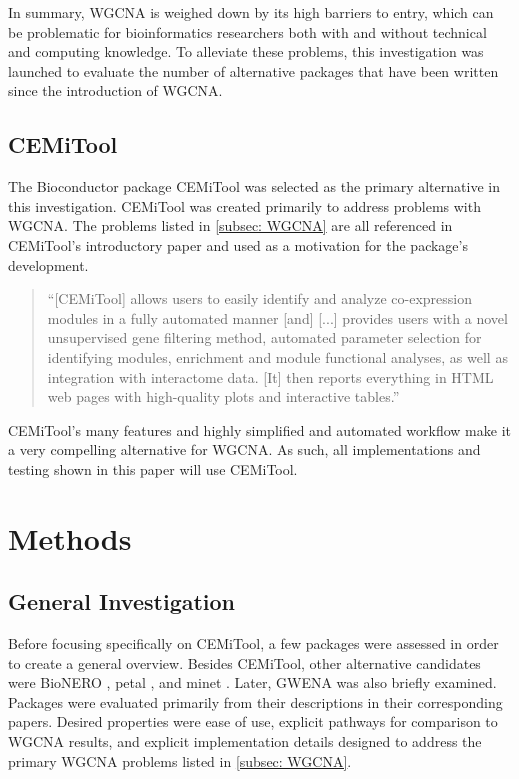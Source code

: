 In summary, WGCNA is weighed down by its high barriers to entry, which can be problematic for bioinformatics researchers both with and without technical and computing knowledge. To alleviate these problems, this investigation was launched to evaluate the number of alternative packages that have been written since the introduction of WGCNA.

\subsection{CEMiTool}
The Bioconductor package CEMiTool \cite{cem} was selected as the primary alternative in this investigation. CEMiTool was created primarily to address problems with WGCNA. The problems listed in \ref{subsec: WGCNA} are all referenced in CEMiTool's introductory paper and used as a motivation for the package's development.

\begin{quote}
    ``[CEMiTool] allows users to easily identify and analyze co-expression modules in a fully automated manner [and] [...] provides users with a novel unsupervised gene filtering method, automated parameter selection for identifying modules, enrichment and module functional analyses, as well as integration with interactome data. [It] then reports everything in HTML web pages with high-quality plots and interactive tables.'' \cite{cem}
\end{quote}

\noindent CEMiTool's many features and highly simplified and automated workflow make it a very compelling alternative for WGCNA. As such, all implementations and testing shown in this paper will use CEMiTool.


\section{Methods}

\subsection{General Investigation}
Before focusing specifically on CEMiTool, a few packages were assessed in order to create a general overview. Besides CEMiTool, other alternative candidates were BioNERO \cite{bionero}, petal \cite{petal}, and minet \cite{minet}. Later, GWENA \cite{gwena} was also briefly examined. Packages were evaluated primarily from their descriptions in their corresponding papers. Desired properties were ease of use, explicit pathways for comparison to WGCNA results, and explicit implementation details designed to address the primary WGCNA problems listed in \ref{subsec: WGCNA}.

